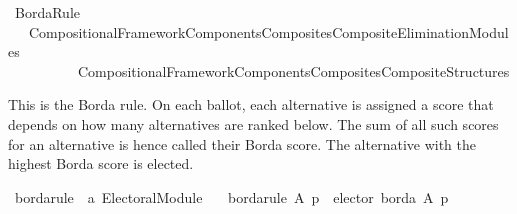 %
\begin{isabellebody}%
%
%
\isadelimdocument
\isanewline
%
\endisadelimdocument
%
\isatagdocument
\isanewline
%
\isamarkuptrue%
%
\isamarkuptrue%
%
\endisatagdocument
{\isafolddocument}%
%
\isadelimdocument
%
\endisadelimdocument
%
\isadelimtheory
%
\endisadelimtheory
%
\isatagtheory
{}\isamarkupfalse%
\ Borda{\isacharunderscore}{\kern0pt}Rule\isanewline
\ \ \ {\isachardoublequoteopen}{\isachardot}{\kern0pt}{\isachardot}{\kern0pt}{\isacharslash}{\kern0pt}Compositional{\isacharunderscore}{\kern0pt}Framework{\isacharslash}{\kern0pt}Components{\isacharslash}{\kern0pt}Composites{\isacharslash}{\kern0pt}Composite{\isacharunderscore}{\kern0pt}Elimination{\isacharunderscore}{\kern0pt}Modules{\isachardoublequoteclose}\isanewline
\ \ \ \ \ \ \ \ \ \ {\isachardoublequoteopen}{\isachardot}{\kern0pt}{\isachardot}{\kern0pt}{\isacharslash}{\kern0pt}Compositional{\isacharunderscore}{\kern0pt}Framework{\isacharslash}{\kern0pt}Components{\isacharslash}{\kern0pt}Composites{\isacharslash}{\kern0pt}Composite{\isacharunderscore}{\kern0pt}Structures{\isachardoublequoteclose}\isanewline
\isanewline
{}%
\endisatagtheory
{\isafoldtheory}%
%
\isadelimtheory
%
\endisadelimtheory
%
\begin{isamarkuptext}%
This is the Borda rule. On each ballot, each alternative is assigned a score
that depends on how many alternatives are ranked below. The sum of all such
scores for an alternative is hence called their Borda score. The alternative
with the highest Borda score is elected.%
\end{isamarkuptext}\isamarkuptrue%
%
\isadelimdocument
%
\endisadelimdocument
%
\isatagdocument
%
\isamarkuptrue%
%
\endisatagdocument
{\isafolddocument}%
%
\isadelimdocument
%
\endisadelimdocument
{}\isamarkupfalse%
\ borda{\isacharunderscore}{\kern0pt}rule\ {\isacharcolon}{\kern0pt}{\isacharcolon}{\kern0pt}\ {\isachardoublequoteopen}{\isacharprime}{\kern0pt}a\ Electoral{\isacharunderscore}{\kern0pt}Module{\isachardoublequoteclose}\ \isanewline
\ \ {\isachardoublequoteopen}borda{\isacharunderscore}{\kern0pt}rule\ A\ p\ {\isacharequal}{\kern0pt}\ elector\ borda\ A\ p{\isachardoublequoteclose}\isanewline
%
\isadelimtheory
\isanewline
%
\endisadelimtheory
%
\isatagtheory
{}\isamarkupfalse%
%
\endisatagtheory
{\isafoldtheory}%
%
\isadelimtheory
%
\endisadelimtheory
%
\end{isabellebody}%
\endinput

